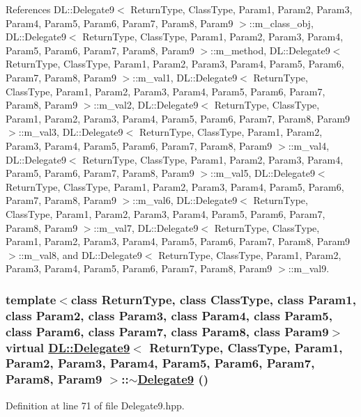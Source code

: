 References DL::Delegate9$<$ Return\-Type, Class\-Type, Param1, Param2, Param3, Param4, Param5, Param6, Param7, Param8, Param9 $>$::m\_\-class\_\-obj, DL::Delegate9$<$ Return\-Type, Class\-Type, Param1, Param2, Param3, Param4, Param5, Param6, Param7, Param8, Param9 $>$::m\_\-method, DL::Delegate9$<$ Return\-Type, Class\-Type, Param1, Param2, Param3, Param4, Param5, Param6, Param7, Param8, Param9 $>$::m\_\-val1, DL::Delegate9$<$ Return\-Type, Class\-Type, Param1, Param2, Param3, Param4, Param5, Param6, Param7, Param8, Param9 $>$::m\_\-val2, DL::Delegate9$<$ Return\-Type, Class\-Type, Param1, Param2, Param3, Param4, Param5, Param6, Param7, Param8, Param9 $>$::m\_\-val3, DL::Delegate9$<$ Return\-Type, Class\-Type, Param1, Param2, Param3, Param4, Param5, Param6, Param7, Param8, Param9 $>$::m\_\-val4, DL::Delegate9$<$ Return\-Type, Class\-Type, Param1, Param2, Param3, Param4, Param5, Param6, Param7, Param8, Param9 $>$::m\_\-val5, DL::Delegate9$<$ Return\-Type, Class\-Type, Param1, Param2, Param3, Param4, Param5, Param6, Param7, Param8, Param9 $>$::m\_\-val6, DL::Delegate9$<$ Return\-Type, Class\-Type, Param1, Param2, Param3, Param4, Param5, Param6, Param7, Param8, Param9 $>$::m\_\-val7, DL::Delegate9$<$ Return\-Type, Class\-Type, Param1, Param2, Param3, Param4, Param5, Param6, Param7, Param8, Param9 $>$::m\_\-val8, and DL::Delegate9$<$ Return\-Type, Class\-Type, Param1, Param2, Param3, Param4, Param5, Param6, Param7, Param8, Param9 $>$::m\_\-val9.\hypertarget{classDL_1_1Delegate9_a1}{
\subsubsection[$\sim$Delegate9]{\setlength{\rightskip}{0pt plus 5cm}template$<$class Return\-Type, class Class\-Type, class Param1, class Param2, class Param3, class Param4, class Param5, class Param6, class Param7, class Param8, class Param9$>$ virtual \hyperlink{classDL_1_1Delegate9}{DL::Delegate9}$<$ Return\-Type, Class\-Type, Param1, Param2, Param3, Param4, Param5, Param6, Param7, Param8, Param9 $>$::$\sim$\hyperlink{classDL_1_1Delegate9}{Delegate9} ()}}
\label{classDL_1_1Delegate9_a1}




Definition at line 71 of file Delegate9.hpp.

